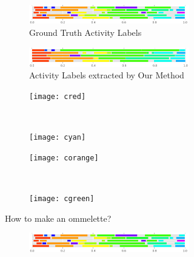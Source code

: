 \begin{figure}
  \begin{subfigure}[b]{0.47\textwidth}
    \begin{subfigure}[b]{\textwidth}
      \includegraphics[width=\textwidth]{act_gt_2}
      \caption*{Ground Truth Activity Labels}
    \end{subfigure}
    \begin{subfigure}[b]{\textwidth}
      \includegraphics[width=\textwidth]{act_our_2}
      \caption*{Activity Labels extracted by Our Method}
    \end{subfigure}
    \begin{subfigure}[b]{0.5\textwidth}
      \texttt{[image: cred]}
      \color[HTML]{FF3800}{Crack the eggs one at a time into a bowl.}
    \end{subfigure}~
    \begin{subfigure}[b]{0.5\textwidth}
      \texttt{[image: cyan]}
      \color[HTML]{00FFED}{Remove the omelette onto a plate.}
    \end{subfigure}
    \begin{subfigure}[b]{0.5\textwidth}
      \texttt{[image: corange]}
      \color[HTML]{FF9900}{You can either use a fork or wire whisk to beat the eggs into a bowl.}
    \end{subfigure}~
    \begin{subfigure}[b]{0.5\textwidth}
      \texttt{[image: cgreen]}
      \color[HTML]{9DFF00}{Eggs cook quickly, so make sure the pan gets very hot first; the butter melt completely.}
    \end{subfigure}
    \caption{How to make an ommelette?}
  \end{subfigure}\quad\quad\begin{subfigure}[b]{0.47\textwidth}
    \begin{subfigure}[b]{\textwidth}
      \includegraphics[width=\textwidth]{act_gt_2}

\end{subfigure}
\end{subfigure}
\end{figure}
